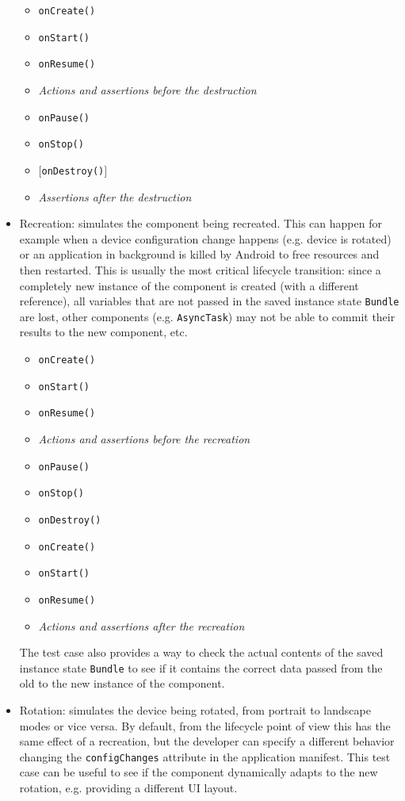 \documentclass[11pt,a4paper,notitlepage]{article}
\begin{document}
\begin{itemize}
	\begin{itemize}
		\item \texttt{onCreate()}
		\item \texttt{onStart()}
		\item \texttt{onResume()}
     	\item \textit{Actions and assertions before the destruction}
		\item \texttt{onPause()}
		\item \texttt{onStop()}
		\item $[$\texttt{onDestroy()}$]$
     	\item \textit{Assertions after the destruction}
	\end{itemize}
	\item Recreation: simulates the component being recreated. This can happen for example when a device configuration change happens (e.g. device is rotated) or an application in background is killed by Android to free resources and then restarted. This is usually the most critical lifecycle transition: since a completely new instance of the component is created (with a different reference), all variables that are not passed in the saved instance state \texttt{Bundle} are lost, other components (e.g. \texttt{AsyncTask}) may not be able to commit their results to the new component, etc.  
	\begin{itemize}
		\item \texttt{onCreate()}
		\item \texttt{onStart()}
		\item \texttt{onResume()}
     	\item \textit{Actions and assertions before the recreation}
		\item \texttt{onPause()}
		\item \texttt{onStop()}
		\item \texttt{onDestroy()}
		\item \texttt{onCreate()}
		\item \texttt{onStart()}
		\item \texttt{onResume()}
     	\item \textit{Actions and assertions after the recreation}
	\end{itemize}
	The test case also provides a way to check the actual contents of the saved instance state \texttt{Bundle} to see if it contains the correct data passed from the old to the new instance of the component.
	\item Rotation: simulates the device being rotated, from portrait to landscape modes or vice versa. By default, from the lifecycle point of view this has the same effect of a recreation, but the developer can specify a different behavior changing the \texttt{configChanges} attribute in the application manifest. This test case can be useful to see if the component dynamically adapts to the new rotation, e.g. providing a different UI layout.

\end{itemize}
\end{document}
